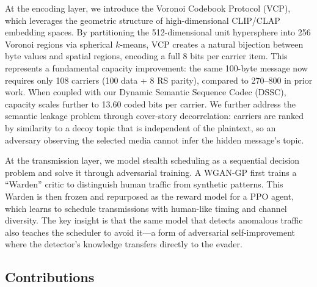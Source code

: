 \documentclass[conference]{IEEEtran}
\begin{document}
At the encoding layer, we introduce the Voronoi Codebook Protocol (VCP), which leverages the geometric structure of high-dimensional CLIP/CLAP embedding spaces. By partitioning the 512-dimensional unit hypersphere into 256 Voronoi regions via spherical $k$-means, VCP creates a natural bijection between byte values and spatial regions, encoding a full 8 bits per carrier item. This represents a fundamental capacity improvement: the same 100-byte message now requires only 108 carriers (100 data + 8 RS parity), compared to 270--800 in prior work. When coupled with our Dynamic Semantic Sequence Codec (DSSC), capacity scales further to 13.60 coded bits per carrier. We further address the semantic leakage problem through cover-story decorrelation: carriers are ranked by similarity to a decoy topic that is independent of the plaintext, so an adversary observing the selected media cannot infer the hidden message's topic.

At the transmission layer, we model stealth scheduling as a sequential decision problem and solve it through adversarial training. A WGAN-GP first trains a ``Warden'' critic to distinguish human traffic from synthetic patterns. This Warden is then frozen and repurposed as the reward model for a PPO agent, which learns to schedule transmissions with human-like timing and channel diversity. The key insight is that the same model that detects anomalous traffic also teaches the scheduler to avoid it---a form of adversarial self-improvement where the detector's knowledge transfers directly to the evader.

\subsection{Contributions}
\end{document}
